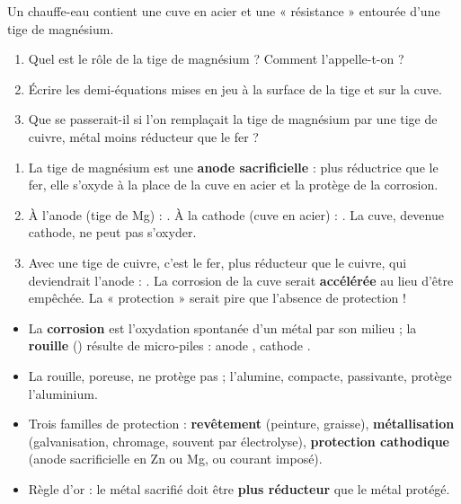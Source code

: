\documentclass[11pt]{article}
\begin{document}
\begin{exercice}
Un chauffe-eau contient une cuve en acier et une « résistance » entourée d'une tige de magnésium.
\begin{enumerate}
\item Quel est le rôle de la tige de magnésium ? Comment l'appelle-t-on ?
\item Écrire les demi-équations mises en jeu à la surface de la tige et sur la cuve.
\item Que se passerait-il si l'on remplaçait la tige de magnésium par une tige de cuivre, métal moins réducteur que le fer ?
\end{enumerate}
\end{exercice}

\begin{corrige}[Exercice]
\begin{enumerate}
\item La tige de magnésium est une \textbf{anode sacrificielle} : plus réductrice que le fer, elle s'oxyde à la place de la cuve en acier et la protège de la corrosion.
\item À l'anode (tige de Mg) : . À la cathode (cuve en acier) : . La cuve, devenue cathode, ne peut pas s'oxyder.
\item Avec une tige de cuivre, c'est le fer, plus réducteur que le cuivre, qui deviendrait l'anode : . La corrosion de la cuve serait \textbf{accélérée} au lieu d'être empêchée. La « protection » serait pire que l'absence de protection !
\end{enumerate}
\end{corrige}

\begin{aretenir}
\begin{itemize}
\item La \textbf{corrosion} est l'oxydation spontanée d'un métal par son milieu ; la \textbf{rouille} () résulte de micro-piles : anode , cathode .
\item La rouille, poreuse, ne protège pas ; l'alumine, compacte, passivante, protège l'aluminium.
\item Trois familles de protection : \textbf{revêtement} (peinture, graisse), \textbf{métallisation} (galvanisation, chromage, souvent par électrolyse), \textbf{protection cathodique} (anode sacrificielle en Zn ou Mg, ou courant imposé).
\item Règle d'or : le métal sacrifié doit être \textbf{plus réducteur} que le métal protégé.
\end{itemize}
\end{aretenir}
\end{document}
